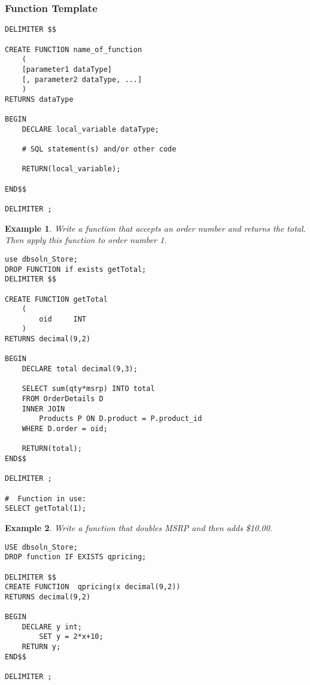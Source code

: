 \documentclass{article}
\newtheorem{example}{Example}
\begin{document}
\subsubsection*{Function Template}

\begin{lstlisting}[frame=single]  
DELIMITER $$

CREATE FUNCTION name_of_function
	(
	[parameter1 dataType]
	[, parameter2 dataType, ...]
	)
RETURNS dataType

BEGIN
	DECLARE local_variable dataType;
	
	# SQL statement(s) and/or other code
	
	RETURN(local_variable);
	
END$$

DELIMITER ;
\end{lstlisting} 



\begin{example}
Write a function that accepts an order number and returns the total.  Then apply this function to order number 1.
\end{example}

\begin{lstlisting}[frame=single]  
use dbsoln_Store;
DROP FUNCTION if exists getTotal;
DELIMITER $$

CREATE FUNCTION getTotal
	(
		oid 	INT
	)
RETURNS decimal(9,2)

BEGIN
	DECLARE total decimal(9,3);
	
	SELECT sum(qty*msrp) INTO total 
    FROM OrderDetails D 
	INNER JOIN
        Products P ON D.product = P.product_id 
    WHERE D.order = oid;
	
	RETURN(total);	
END$$

DELIMITER ;

#  Function in use:
SELECT getTotal(1);
\end{lstlisting} 





\begin{example}
	Write a function that doubles MSRP and then adds \$10.00.  
\end{example}

\begin{lstlisting}[frame=single]  
USE dbsoln_Store;
DROP function IF EXISTS qpricing;

DELIMITER $$
CREATE FUNCTION  qpricing(x decimal(9,2))
RETURNS decimal(9,2)

BEGIN
	DECLARE y int;
        SET y = 2*x+10;
	RETURN y;
END$$

DELIMITER ;
\end{lstlisting} 
\end{document}
